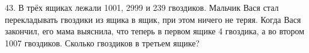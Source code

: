 43. В трёх ящиках лежали 1001, 2999 и 239 гвоздиков. Мальчик Вася стал перекладывать гвоздики из ящика в ящик, при этом ничего не теряя. Когда Вася закончил, его мама выяснила, что теперь в первом ящике 4 гвоздика, а во втором 1007 гвоздиков. Сколько гвоздиков в третьем ящике?\\
